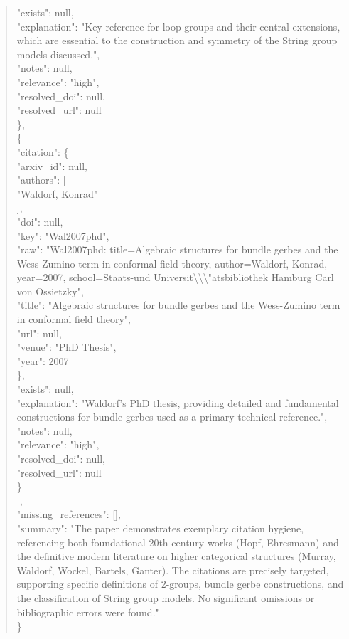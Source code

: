 \documentclass[11pt]{article}
\begin{document}
\begin{quote}
      "exists": null,\\
      "explanation": "Key reference for loop groups and their central extensions, which are essential to the construction and symmetry of the String group models discussed.",\\
      "notes": null,\\
      "relevance": "high",\\
      "resolved\_doi": null,\\
      "resolved\_url": null\\
    \},\\
    \{\\
      "citation": \{\\
        "arxiv\_id": null,\\
        "authors": [\\
          "Waldorf, Konrad"\\
        ],\\
        "doi": null,\\
        "key": "Wal2007phd",\\
        "raw": "Wal2007phd: title=Algebraic structures for bundle gerbes and the Wess-Zumino term in conformal field theory, author=Waldorf, Konrad, year=2007, school=Staats-und Universit\textbackslash{}\textbackslash{}\textbackslash{}"atsbibliothek Hamburg Carl von Ossietzky",\\
        "title": "Algebraic structures for bundle gerbes and the Wess-Zumino term in conformal field theory",\\
        "url": null,\\
        "venue": "PhD Thesis",\\
        "year": 2007\\
      \},\\
      "exists": null,\\
      "explanation": "Waldorf's PhD thesis, providing detailed and fundamental constructions for bundle gerbes used as a primary technical reference.",\\
      "notes": null,\\
      "relevance": "high",\\
      "resolved\_doi": null,\\
      "resolved\_url": null\\
    \}\\
  ],\\
  "missing\_references": [],\\
  "summary": "The paper demonstrates exemplary citation hygiene, referencing both foundational 20th-century works (Hopf, Ehresmann) and the definitive modern literature on higher categorical structures (Murray, Waldorf, Wockel, Bartels, Ganter). The citations are precisely targeted, supporting specific definitions of 2-groups, bundle gerbe constructions, and the classification of String group models. No significant omissions or bibliographic errors were found."\\
\}\\
\end{quote}
\end{document}
